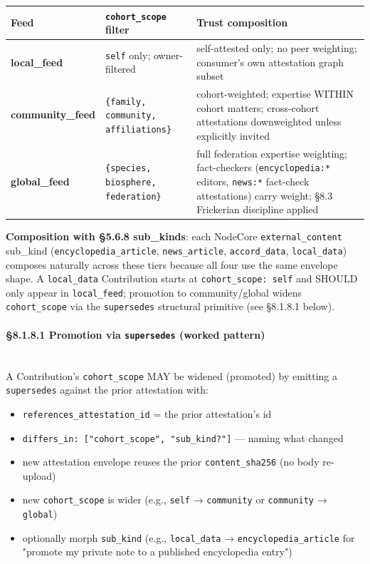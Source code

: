 \documentclass[11pt]{article}
\begin{document}
{\footnotesize
\begin{longtable}{|p{5.33cm}|p{5.33cm}|p{5.33cm}|}\hline
\textbf{Feed} & \textbf{\texttt{cohort\_scope} filter} & \textbf{Trust composition} \\ \hline\endhead
\textbf{local\_feed} & \texttt{self} only; owner-filtered & self-attested only; no peer weighting; consumer's own attestation graph subset \\ \hline
\textbf{community\_feed} & \texttt{\{family, community, affiliations\}} & cohort-weighted; expertise WITHIN cohort matters; cross-cohort attestations downweighted unless explicitly invited \\ \hline
\textbf{global\_feed} & \texttt{\{species, biosphere, federation\}} & full federation expertise weighting; fact-checkers (\texttt{encyclopedia:*} editors, \texttt{news:*} fact-check attestations) carry weight; §8.3 Frickerian discipline applied \\ \hline
\end{longtable}}


\textbf{Composition with §5.6.8 sub\_kinds}: each NodeCore \texttt{external\_content} sub\_kind (\texttt{encyclopedia\_article}, \texttt{news\_article}, \texttt{accord\_data}, \texttt{local\_data}) composes naturally across these tiers because all four use the same envelope shape. A \texttt{local\_data} Contribution starts at \texttt{cohort\_scope: self} and SHOULD only appear in \texttt{local\_feed}; promotion to community/global widens \texttt{cohort\_scope} via the \texttt{supersedes} structural primitive (see §8.1.8.1 below).


\paragraph{§8.1.8.1 Promotion via \texttt{supersedes} (worked pattern)}\mbox{}\\


A Contribution's \texttt{cohort\_scope} MAY be widened (promoted) by emitting a \texttt{supersedes} against the prior attestation with:


\begin{itemize}\setlength\itemsep{0pt}
\item \texttt{references\_attestation\_id} = the prior attestation's id
\item \texttt{differs\_in: ["cohort\_scope", "sub\_kind?"]} — naming what changed
\item new attestation envelope reuses the prior \texttt{content\_sha256} (no body re-upload)
\item new \texttt{cohort\_scope} is wider (e.g., \texttt{self} → \texttt{community} or \texttt{community} → \texttt{global})
\item optionally morph \texttt{sub\_kind} (e.g., \texttt{local\_data} → \texttt{encyclopedia\_article} for "promote my private note to a published encyclopedia entry")
\end{itemize}
\end{document}
